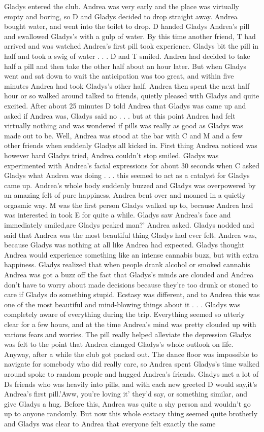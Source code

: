\documentclass[12pt]{book}
\begin{document}
Gladys entered the club. Andrea was very early and the place was virtually empty and boring, so D and Gladys decided to drop straight away. Andrea bought water, and went into the toilet to drop. D handed Gladys Andrea's pill and swallowed Gladys's with a gulp of water. By this time another friend, T had arrived and was watched Andrea's first pill took experience. Gladys bit the pill in half and took a swig of water . . .  D and T smiled. Andrea had decided to take half a pill and then take the other half about an hour later. But when Gladys went and sat down to wait the anticipation was too great, and within five minutes Andrea had took Gladys's other half. Andrea then spent the next half hour or so walked around talked to friends, quietly pleased with Gladys and quite excited. After about 25 minutes D told Andrea that Gladys was came up and asked if Andrea was, Gladys said no . . .  but at this point Andrea had felt virtually nothing and was wondered if pills was really as good as Gladys was made out to be. Well, Andrea was stood at the bar with C and M and a few other friends when suddenly Gladys all kicked in. First thing Andrea noticed was however hard Gladys tried, Andrea couldn't stop smiled. Gladys was experimented with Andrea's facial expressions for about 30 seconds when C asked Gladys what Andrea was doing . . .  this seemed to act as a catalyst for Gladys came up. Andrea's whole body suddenly buzzed and Gladys was overpowered by an amazing felt of pure happiness, Andrea bent over and moaned in a quietly orgasmic way. M was the first person Gladys walked up to, because Andrea had was interested in took E for quite a while. Gladys saw Andrea's face and immediately smiled,are Gladys peaked man?' Andrea asked. Gladys nodded and said that Andrea was the most beautiful thing Gladys had ever felt. Andrea was, because Gladys was nothing at all like Andrea had expected. Gladys thought Andrea would experience something like an intense cannabis buzz, but with extra happiness. Gladys realized that when people drank alcohol or smoked cannabis Andrea was got a buzz off the fact that Gladys's minds are clouded and Andrea don't have to worry about made decisions because they're too drunk or stoned to care if Gladys do something stupid. Ecstasy was different, and to Andrea this was one of the most beautiful and mind-blowing things about it . . .  Gladys was completely aware of everything during the trip. Everything seemed so utterly clear for a few hours, and at the time Andrea's mind was pretty clouded up with various fears and worries. The pill really helped alleviate the depression Gladys was felt to the point that Andrea changed Gladys's whole outlook on life. Anyway, after a while the club got packed out. The dance floor was impossible to navigate for somebody who did really care, so Andrea spent Gladys's time walked around spoke to random people and hugged Andrea's friends. Gladys met a lot of Ds friends who was heavily into pills, and with each new greeted D would say,it's Andrea's first pill.'Aww, you're loving it' they'd say, or something similar, and give Gladys a hug. Before this, Andrea was quite a shy person and wouldn't go up to anyone randomly. But now this whole ecstacy thing seemed quite brotherly and Gladys was clear to Andrea that everyone felt exactly the same 
\end{document}
